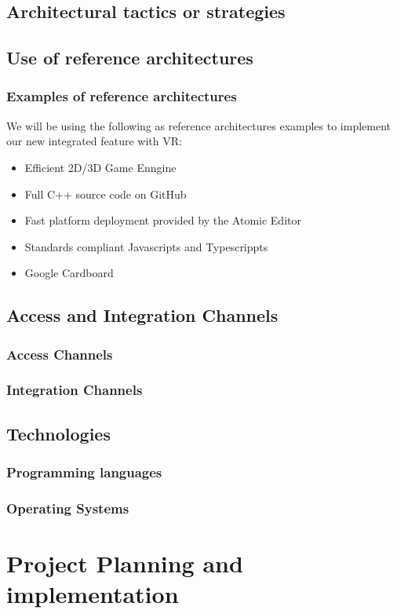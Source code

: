 \documentclass[a4paper,12pt]{article}
\begin{document}
\subsection{Architectural tactics or strategies}

\newpage
\subsection{Use of reference architectures}
\subsubsection{Examples of reference architectures}
We will be using the following as reference architectures examples to implement our new integrated feature with VR:
\begin{itemize}
\item Efficient 2D/3D Game Enngine
\item Full C++ source code on GitHub
\item Fast platform deployment provided by the Atomic Editor
\item Standards compliant Javascripts and Typescrippts
\item Google Cardboard
\end{itemize}
\subsection{Access and Integration Channels}
\subsubsection{Access Channels}
\subsubsection{Integration Channels}

\newpage
\subsection{Technologies}	
	\subsubsection{Programming languages}
	
	\subsubsection{Operating Systems}
\newpage
\section{Project Planning and implementation}
	
\end{document}
